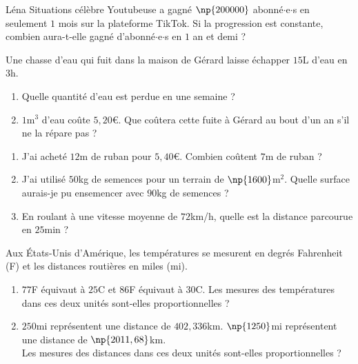 \documentclass[a4paper,10pt]{report}
\begin{document}
\begin{ex}
Léna Situations célèbre Youtubeuse a gagné $\np{200 000}$ abonné$\cdot$e$\cdot$s  en seulement $1$ mois sur la plateforme TikTok. Si la progression est constante, combien aura-t-elle gagné d'abonné$\cdot$e$\cdot$s en $1$ an et demi ?
\end{ex}

\begin{ex}
Une chasse d'eau qui fuit dans la maison de Gérard laisse échapper $15$L d'eau en $3$h.
\begin{enumerate}[font=\color{exer1}]
\item Quelle quantité d'eau est perdue en une semaine ?
\item $1$m$^3$ d'eau coûte $5,20$\euro. Que coûtera cette fuite à Gérard au bout d'un an s'il ne la répare pas ?
\end{enumerate}
\end{ex}

\begin{ex}

\medskip
\begin{enumerate}[font=\color{exer1}]
\item J'ai acheté $12$m de ruban pour $5,40$\euro. Combien coûtent $7$m de ruban ?
\item J'ai utilisé $50$kg de semences pour un terrain de $\np{1 600}$m$^2$.
Quelle surface aurais-je pu ensemencer avec $90$kg de semences ?
\item En roulant à une vitesse moyenne de $72$km/h, quelle est la distance parcourue en $25$min ?
\end{enumerate}
\end{ex}

\begin{ex}
Aux États-Unis d'Amérique, les températures se mesurent en degrés Fahrenheit (\degre F) et les distances routières en miles (mi).
\begin{enumerate}[font=\color{exer1}]
\item $77$\degre F équivaut à $25$\degre C et $86$\degre F équivaut à $30$\degre C.
Les mesures des températures dans ces deux unités sont-elles proportionnelles ?
\item $250$mi représentent une distance de $402,336$km. $\np{1 250}$mi représentent une distance de $\np{2 011,68}$km.\\Les mesures des distances dans ces deux unités sont-elles proportionnelles ?
\end{enumerate}
\end{ex}
\end{document}
